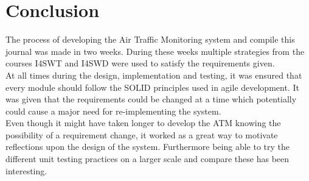 \section{Conclusion}
The process of developing the Air Traffic Monitoring system and compile this journal was made in two weeks. During these weeks multiple strategies from the courses I4SWT and I4SWD were used to satisfy the requirements given. \\ 
At all times during the design, implementation and testing, it was ensured that every module should follow the SOLID principles used in agile development. It was given that the requirements could be changed at a time which potentially could cause a major need for re-implementing the system. \\
Even though it might have taken longer to develop the ATM knowing the possibility of a requirement change, it worked as a great way to motivate reflections upon the design of the system. Furthermore being able to try the different unit testing practices on a larger scale and compare these has been interesting.